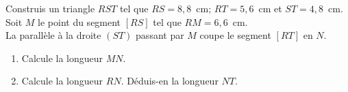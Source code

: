 
Construis un triangle $RST$ tel que $RS=8,8$~cm; $RT=5,6$~cm et
 $ST=4,8$~cm.  Soit $M$ le point du segment $[RS]$ tel que
 $RM=6,6$~cm.\\La parallèle à la droite $(ST)$ passant par $M$
 coupe le segment $[RT]$ en $N$.
\begin{enumerate}
\item Calcule la longueur $MN$.
\item Calcule la longueur $RN$. Déduis-en la longueur $NT$.
\end{enumerate}




